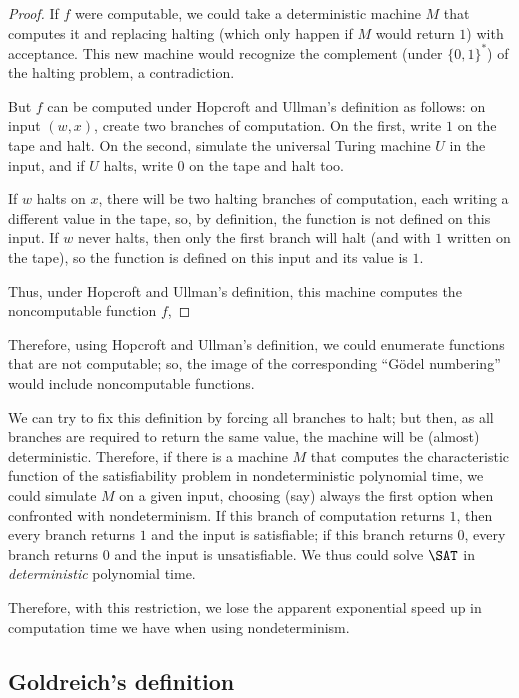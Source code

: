 \documentclass[12pt]{article}
\theoremstyle{definition}
\begin{document}
\begin{proof}
    If $f$ were computable,
    we could take a deterministic machine $M$ that computes it
    and replacing halting
    (which only happen if $M$ would return $1$)
    with acceptance.
    This new machine would recognize the complement (under $\{0, 1\}^*$)
    of the halting problem,
    a contradiction.

    But $f$ can be computed under Hopcroft and Ullman's definition as follows:
    on input $(w, x)$,
    create two branches of computation.
    On the first, write $1$ on the tape and halt.
    On the second, simulate the universal Turing machine $U$ in the input,
    and if $U$ halts, write $0$ on the tape and halt too.

    If $w$ halts on $x$,
    there will be two halting branches of computation,
    each writing a different value in the tape,
    so, by definition, the function is not defined on this input.
    If $w$ never halts,
    then only the first branch will halt
    (and with $1$ written on the tape),
    so the function is defined on this input and its value is $1$.

    Thus, under Hopcroft and Ullman's definition,
    this machine computes the noncomputable function $f$,
\end{proof}

Therefore,
using Hopcroft and Ullman's definition,
we could enumerate functions that are not computable;
so, the image of the corresponding ``Gödel numbering''
would include noncomputable functions.

We can try to fix this definition by forcing all branches to halt;
but then, as all branches are required to return the same value,
the machine will be (almost) deterministic.
Therefore, if there is a machine $M$ that computes the characteristic function
of the satisfiability problem in nondeterministic polynomial time,
we could simulate $M$ on a given input,
choosing (say) always the first option when confronted with nondeterminism.
If this branch of computation returns $1$,
then every branch returns $1$ and the input is satisfiable;
if this branch returns $0$, every branch returns $0$ and the input is unsatisfiable.
We thus could solve $\SAT$ in \emph{deterministic} polynomial time.

Therefore, with this restriction,
we lose the apparent exponential speed up in computation time
we have when using nondeterminism.

\subsection{Goldreich's definition}
\label{sec:goldreich}
\end{document}
